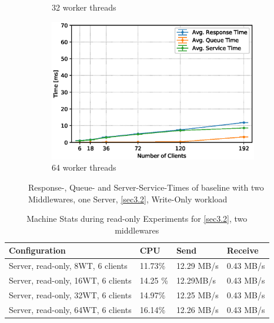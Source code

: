\documentclass[11pt,a4paper]{article}
\begin{document}
\begin{figure}
\begin{subfigure}{.5\textwidth}
        \caption{32 worker threads}
    \end{subfigure}
    \begin{subfigure}{.5\textwidth}
        \includegraphics[width=1\linewidth]{plots/3_2b_extendedLatencyMiddleware_64w.eps}
        \caption{64 worker threads}
    \end{subfigure}

    \caption{Response-, Queue- and Server-Service-Times of baseline with two Middlewares, one Server, \autoref{sec3.2}, Write-Only workload}
    \label{fig:3-2-times-writeonly}
\end{figure}

\begin{center}
    \begin{table}
    	\begin{tabular}{|l|p{2cm}|p{2cm}|p{2cm}|}
            \hline \textbf{Configuration} & \textbf{CPU} & \textbf{Send} & \textbf{Receive}\\
            \hline Server, read-only, 8WT, 6 clients & 11.73\%         & 12.29 MB/s    & 0.43 MB/s\\
            \hline Server, read-only, 16WT, 6 clients & 14.25 \%         & 12.29MB/s    & 0.43 MB/s\\
            \hline Server, read-only, 32WT, 6 clients & 14.97\%         & 12.25 MB/s    & 0.43 MB/s\\
            \hline Server, read-only, 64WT, 6 clients & 16.14\%         & 12.26 MB/s    & 0.43 MB/s\\
            \hline
    	\end{tabular}
	\caption{Machine Stats during read-only Experiments for \autoref{sec3.2}, two middlewares}
    \label{dstat:3-2}
	\end{table}
\end{center}
\end{document}
